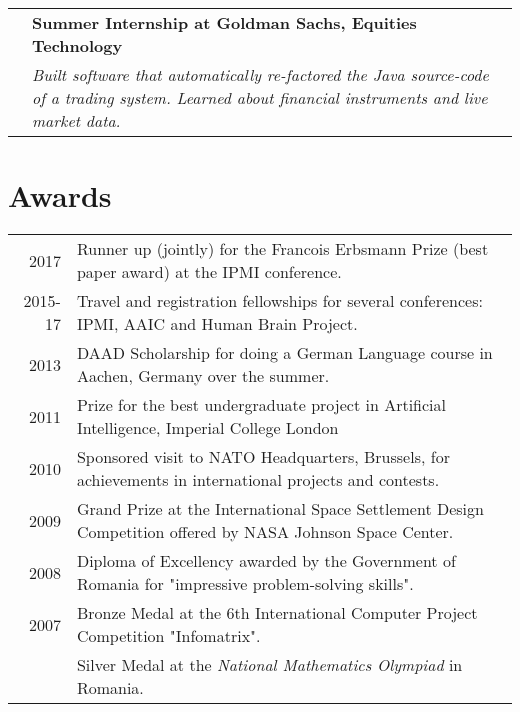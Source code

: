 \documentclass[a4paper,10pt]{article} %
\begin{document}
\begin{tabular}{>{\raggedleft\arraybackslash} p{0.93cm}|p{15cm}}
2012 & \large\textbf{Summer Internship at Goldman Sachs, Equities Technology}\\
 & \emph{Built software that automatically re-factored the Java source-code of a trading system. Learned about financial instruments and live market data.}\\




\end{tabular}


\section*{Awards}

\begin{tabular}{r|p{15.7cm}}
2017 & Runner up (jointly) for the Francois Erbsmann Prize (best paper award) at the IPMI conference.\\
2015-17 & Travel and registration fellowships for several conferences: IPMI, AAIC and Human Brain Project.\\
2013 & DAAD Scholarship for doing a German Language course in Aachen, Germany over the summer.\\
2011 & Prize for the best undergraduate project in Artificial Intelligence, Imperial College London\\
2010 & Sponsored visit to NATO Headquarters, Brussels, for achievements in international projects and contests.\\
2009 & Grand Prize at the International Space Settlement Design Competition offered by NASA Johnson Space Center.\\
2008 & Diploma of Excellency awarded by the Government of Romania for "impressive problem-solving skills".\\
2007 & Bronze Medal at the 6th International Computer Project Competition
"Infomatrix".\\
& Silver Medal at the \emph{National Mathematics Olympiad} in Romania.
\end{tabular}
\end{document}
